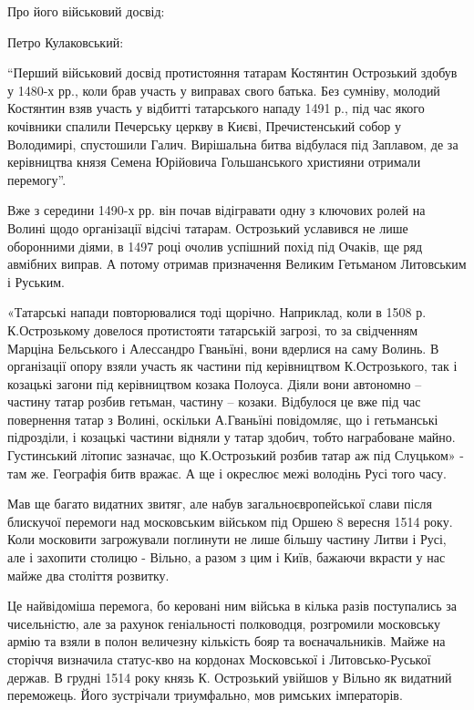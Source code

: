 Про його військовий досвід:

Петро Кулаковський:

\enquote{Перший військовий досвід протистояння татарам Костянтин Острозький здобув у
1480-х рр., коли брав участь у виправах свого батька. Без сумніву, молодий
Костянтин взяв участь у відбитті татарського нападу 1491 р., під час якого
кочівники спалили Печерську церкву в Києві, Пречистенський собор у Володимирі,
спустошили Галич. Вирішальна битва відбулася під Заплавом, де за керівництва
князя Семена Юрійовича Гольшанського християни отримали перемогу}.

Вже з середини 1490-х рр. він почав відігравати одну з ключових ролей на Волині
щодо організації відсічі татарам. Острозький уславився не лише оборонними
діями, в 1497 році очолив успішний похід під Очаків, ще ряд авмібних виправ. А
потому отримав призначення Великим Гетьманом Литовським і Руським.

«Татарські напади повторювалися тоді щорічно. Наприклад, коли в 1508 р.
К.Острозькому довелося протистояти татарській загрозі, то за свідченням Марціна
Бельського і Алессандро Гваньїні, вони вдерлися на саму Волинь. В організації
опору взяли участь як частини під керівництвом К.Острозького, так і козацькі
загони під керівництвом козака Полоуса. Діяли вони автономно – частину татар
розбив гетьман, частину – козаки. Відбулося це вже під час повернення татар з
Волині, оскільки А.Гваньїні повідомляє, що і гетьманські підрозділи, і козацькі
частини відняли у татар здобич, тобто награбоване майно. Густинський літопис
зазначає, що К.Острозький розбив татар аж під Слуцьком» - там же. Географія
битв вражає. А ще і окреслює межі володінь Русі того часу.

Мав ще багато видатних звитяг, але набув загальноєвропейської слави після
блискучої перемоги над московським військом під Оршею 8 вересня 1514 року. Коли
московити загрожували поглинути не лише більшу частину Литви і Русі, але і
захопити столицю - Вільно, а разом з цим і Київ, бажаючи вкрасти у нас майже
два століття розвитку. 

Це найвідоміша перемога, бо керовані ним війська в кілька разів поступались за
чисельністю, але за рахунок геніальності полководця, розгромили московську
армію та взяли в полон величезну кількість бояр та воєначальників. Майже на
сторіччя визначила статус-кво на кордонах Московської і Литовсько-Руської
держав. В грудні 1514 року князь К. Острозький увійшов у Вільно як видатний
переможець. Його зустрічали триумфально, мов римських імператорів. 

